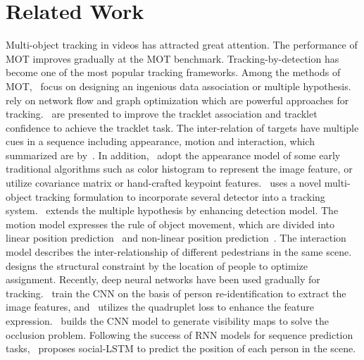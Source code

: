 \documentclass[5pt]{article}
\begin{document}
\section{Related Work}
\vspace{-0.2cm}
Multi-object tracking in videos has attracted great attention. The performance of MOT improves gradually at the MOT benchmark. Tracking-by-detection has become one of the most popular tracking frameworks. Among the methods of MOT,~\cite{tang2017multiple,xiang2015learning,choi2015near,kim2015multiple,chen2017enhancing} focus on designing an ingenious data association or multiple hypothesis.~\cite{schulter2017deep,Levinkov2017Joint,Maksai2016Globally} rely on network flow and graph optimization which are powerful approaches for tracking.~\cite{wang2016joint,bae2014robust} are presented to improve the tracklet association and tracklet confidence to achieve the tracklet task. The inter-relation of targets have multiple cues in a sequence including appearance, motion and interaction, which summarized are by~\cite{sadeghian2017tracking}. In addition,~\cite{le2016long,hong2016online} adopt the appearance model of some early traditional algorithms such as color histogram to represent the image feature, or~\cite{choi2015near,bae2014robust,yang2016temporal} utilize covariance matrix or hand-crafted keypoint features.~\cite{Henschel2017A} uses a novel multi-object tracking formulation to incorporate several detector into a tracking system.~\cite{kim2015multiple} extends the multiple hypothesis by enhancing detection model. The motion model expresses the rule of object movement, which are divided into linear position prediction~\cite{son2017multi} and non-linear position prediction~\cite{dicle2013way}. The interaction model describes the inter-relationship of different pedestrians in the same scene. ~\cite{hong2016online} designs the structural constraint by the location of people to optimize assignment. Recently, deep neural networks have been used gradually for tracking.~\cite{tang2017multiple,sadeghian2017tracking} train the CNN on the basis of person re-identification to extract the image features, and~\cite{son2017multi} utilizes the quadruplet loss to enhance the feature expression.~\cite{chu2017online} builds the CNN model to generate visibility maps to solve the occlusion problem. Following the success of RNN models for sequence prediction tasks,~\cite{alahi2016social} proposes social-LSTM to predict the position of each person in the scene.
\end{document}
